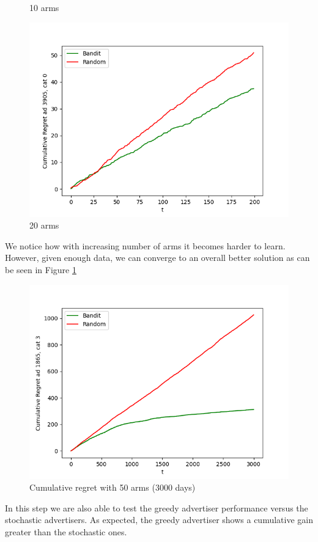 \documentclass{article}
\begin{document}
\begin{figure}[H]
\begin{minipage}{0.33\textwidth}
\caption{10 arms}
\end{minipage}
\begin{minipage}{0.33\textwidth}
\centering
\includegraphics[width=1\linewidth]{images/quality 20 arms 200 days.png}
\caption{20 arms}
\end{minipage}
\end{figure}
We notice how with increasing number of arms it becomes harder to learn. However, given enough data, we can converge to an overall better solution as can be seen in Figure \ref{fig:step5_3000days}
\begin{figure}[H]
    \centering
    \includegraphics[width=0.66\linewidth]{images/quality 50 arms.png}
    \caption{Cumulative regret with 50 arms (3000 days)}
    \label{fig:step5_3000days}
\end{figure}

In this step we are also able to test the greedy advertiser performance versus the stochastic advertisers. As expected, the greedy advertiser shows a cumulative gain greater than the stochastic ones.
\end{document}
